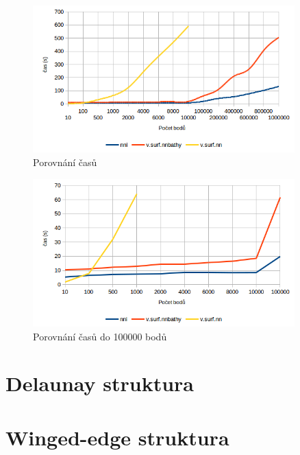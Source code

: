 \documentclass[12pt,a4paper]{article}
\begin{document}
\begin{figure}[h!]
\centering
\includegraphics[width=0.9\textwidth]{img/graf.png}
\caption{Porovnání časů}
\label{fig:graf}
\end{figure}

\begin{figure}[h!]
\centering
\includegraphics[width=0.9\textwidth]{img/graf_detail.png}
\caption{Porovnání časů do 100000 bodů}
\label{fig:graf_det}
\end{figure}

\newpage
\section{Delaunay struktura}
\label{app:delaunay_struct}


\newpage
\section{Winged-edge struktura}
\label{app:edge_struct}


\end{document}
